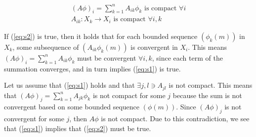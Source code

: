 \documentclass{article}[11pt]
\begin{document}
   \begin{align}
   \left(A\phi\right)_i = \sum_{k=1}^n A_{ik} \phi_k \text{ is compact } \forall i \label{eq:s1}\\
   A_{ik}: X_k \rightarrow X_i \text{ is compact } \forall i,k \label{eq:s2}
   \end{align}
   
   If (\ref{eq:s2}) is true, then it holds that for each bounded sequence $\left(\phi_k(m)\right)$ in $X_k$, some subsequence of $\left(A_{ik}\phi_k(m)\right)$ is convergent in $X_i$. This means $\left(A\phi\right)_i = \sum_{k=1}^n A_{ik} \phi_k$ must be convergent $\forall i,k$, since each term of the summation converges, and in turn implies (\ref{eq:s1}) is true.
   
   Let us assume that (\ref{eq:s1}) holds and that $\exists j,l \ni A_{jl}$ is not compact. This means that $\left(A\phi\right)_j = \sum_{k=1}^n A_{jk} \phi_k$ is not compact for some $j$ because the sum is not convergent based on some bounded sequence $\left(\phi(m)\right)$. Since $\left(A\phi\right)_j$ is not convergent for some $j$, then $A\phi$ is not compact. Due to this contradiction, we see that (\ref{eq:s1}) implies that (\ref{eq:s2}) must be true. 
\end{document}
